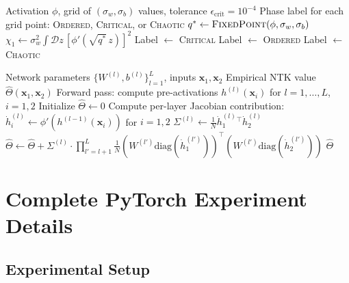 \documentclass[10pt]{article}
\begin{document}
\begin{algorithm}[t]
\caption{Phase Diagram Classification}
\label{alg:phase-diagram}
\begin{algorithmic}[1]
\Require Activation $\phi$, grid of $(\sigma_w, \sigma_b)$ values, tolerance $\epsilon_{\text{crit}} = 10^{-4}$
\Ensure Phase label for each grid point: \textsc{Ordered}, \textsc{Critical}, or \textsc{Chaotic}
    \State $q^* \gets \textsc{FixedPoint}(\phi, \sigma_w, \sigma_b)$
    \State $\chi_1 \gets \sigma_w^2 \int \mathcal{D}z\, [\phi'(\sqrt{q^*}\, z)]^2$
        \State Label $\gets$ \textsc{Critical}
        \State Label $\gets$ \textsc{Ordered}
    \Else
        \State Label $\gets$ \textsc{Chaotic}
    \EndIf
\EndFor
\end{algorithmic}
\end{algorithm}

\begin{algorithm}[t]
\caption{NTK Computation (Finite Width, Recursive)}
\label{alg:ntk}
\begin{algorithmic}[1]
\Require Network parameters $\{W^{(l)}, b^{(l)}\}_{l=1}^L$, inputs $\mathbf{x}_1, \mathbf{x}_2$
\Ensure Empirical NTK value $\hat{\Theta}(\mathbf{x}_1, \mathbf{x}_2)$
\State Forward pass: compute pre-activations $h^{(l)}(\mathbf{x}_i)$ for $l = 1, \ldots, L$, $i = 1, 2$
\State Initialize $\hat{\Theta} \gets 0$
    \State Compute per-layer Jacobian contribution:
    \State \quad $\dot{h}^{(l)}_i \gets \phi'(h^{(l-1)}(\mathbf{x}_i))$ for $i = 1, 2$
    \State \quad $\Sigma^{(l)} \gets \frac{1}{N} \dot{h}^{(l)}_1{}^\top \dot{h}^{(l)}_2$
    \State \quad $\hat{\Theta} \gets \hat{\Theta} + \Sigma^{(l)} \cdot \prod_{l'=l+1}^{L} \frac{1}{N}(W^{(l')}\text{diag}(\dot{h}^{(l')}_1))^\top (W^{(l')}\text{diag}(\dot{h}^{(l')}_2))$
\EndFor
\State \Return $\hat{\Theta}$
\end{algorithmic}
\end{algorithm}


\section{Complete PyTorch Experiment Details}
\label{app:pytorch}

\subsection{Experimental Setup}
\end{document}
